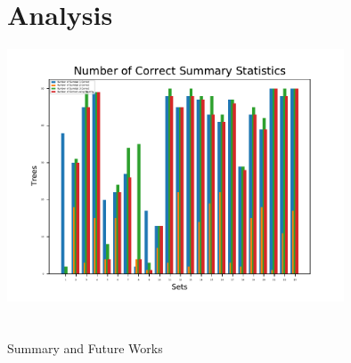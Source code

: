 \documentclass[10pt,aspectratio=169,notheorems,hyperref={pdfauthor=whatever}]{beamer}
\begin{document}
\section{Analysis}
\begin{frame}
  \centering
  \includegraphics[width=10cm, angle=0]{correctsumstats}
\end{frame}

\section{}
\begin{frame}
  \centering
  {\Large Summary and Future Works}
\end{frame}
\end{document}

